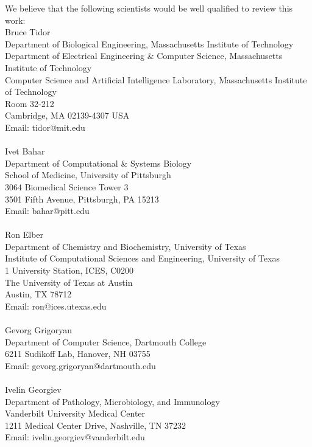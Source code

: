 \documentclass[11pt, oneside]{article}   	%
\begin{document}
We believe that the following scientists would be well qualified to review this work:
\\

\hspace{-0.285in} Bruce Tidor \\Department of Biological Engineering, Massachusetts Institute of Technology \\Department of Electrical Engineering \& Computer Science, Massachusetts Institute of Technology \\Computer Science and Artificial Intelligence Laboratory, Massachusetts Institute of Technology \\Room 32-212 \\Cambridge, MA 02139-4307 USA \\Email: tidor@mit.edu \\
 \\\hspace{-0.285in} Ivet Bahar \\Department of Computational \& Systems Biology \\School of Medicine, University of Pittsburgh \\3064 Biomedical Science Tower 3 \\3501 Fifth Avenue, Pittsburgh, PA 15213 \\Email: bahar@pitt.edu \\
  \\\hspace{-0.285in} Ron Elber \\Department of Chemistry and Biochemistry, University of Texas \\Institute of Computational Sciences and Engineering, University of Texas \\1 University Station, ICES, C0200 \\The University of Texas at Austin \\Austin, TX 78712 \\Email: ron@ices.utexas.edu \\
     \\\hspace{-0.285in} Gevorg Grigoryan \\Department of Computer Science, Dartmouth College \\6211 Sudikoff Lab, Hanover, NH 03755 \\Email: gevorg.grigoryan@dartmouth.edu \\
     \\\hspace{-0.285in} Ivelin Georgiev \\ Department of Pathology, Microbiology, and Immunology \\Vanderbilt University Medical Center \\ 1211 Medical Center Drive, Nashville, TN 37232  \\Email:  ivelin.georgiev@vanderbilt.edu \\
\end{document}
